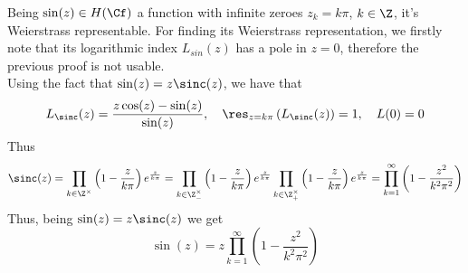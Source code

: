 \documentclass[../mmf.tex]{subfiles}
\begin{document}
\begin{eg}
	Being $\sin(z)\in H(\Cf)$ a function with infinite zeroes $z_k=k\pi$, $k\in\Z$, it's Weierstrass representable. For finding its Weierstrass representation, we firstly note that its logarithmic index $L_{sin}(z)$ has a pole in $z=0$, therefore the previous proof is not usable.\\
	Using the fact that $\sin(z)=z\sinc(z)$, we have that
	\begin{equation*}
		L_{\sinc}(z)=\frac{z\cos(z)-\sin(z)}{\sin(z)}, \quad\res_{z=k\pi}\left( L_{\sinc}(z) \right)=1, \quad L(0)=0
	\end{equation*}
	Thus
	\begin{equation}
		\sinc(z)=\prod_{k\in\Z^{\times}}\left( 1-\frac{z}{k\pi} \right)e^{\frac{z}{k\pi}}=\prod_{k\in\Z^{\times}_{-}}\left( 1-\frac{z}{k\pi} \right)e^{\frac{z}{k\pi}}\prod_{k\in\Z^{\times}_{+}}\left( 1-\frac{z}{k\pi} \right)e^{\frac{z}{k\pi}}=\prod_{k=1}^{\infty}\left( 1-\frac{z^2}{k^2\pi^2} \right)
		\label{eq:sincweierstrassexp}
	\end{equation}
	Thus, being $\sin(z)=z\sinc(z)$ we get
	\begin{equation}
		\sin(z)=z\prod_{k=1}^{\infty}\left( 1-\frac{z^2}{k^2\pi^2} \right)
		\label{eq:sinweierstrassexp}
	\end{equation}
\end{eg}
\end{document}
